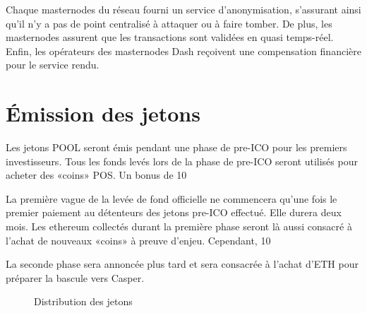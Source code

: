 Chaque masternodes du réseau fourni un service d'anonymisation, s'assurant ainsi qu'il n'y a pas de point centralisé à attaquer ou à faire tomber. De plus, les masternodes assurent que les transactions sont validées en quasi temps-réel. Enfin, les opérateurs des masternodes Dash reçoivent une compensation financière pour le service rendu.

\newpage

\section{Émission des jetons}
Les jetons POOL seront émis pendant une phase de pre-ICO pour les premiers investisseurs. Tous les fonds levés lors de la phase de pre-ICO seront utilisés pour acheter des «coins» POS. Un bonus de 10%

La première vague de la levée de fond officielle ne commencera qu'une fois le premier paiement au détenteurs des jetons pre-ICO effectué. Elle durera deux mois. Les ethereum collectés durant la première phase seront là aussi consacré à l'achat de nouveaux «coins» à preuve d'enjeu. Cependant, 10%

La seconde phase sera annoncée plus tard et sera consacrée à l'achat d'ETH pour préparer la bascule vers Casper.


\begin{figure}[h]
\centering
\caption{Distribution des jetons}
\end{figure}

